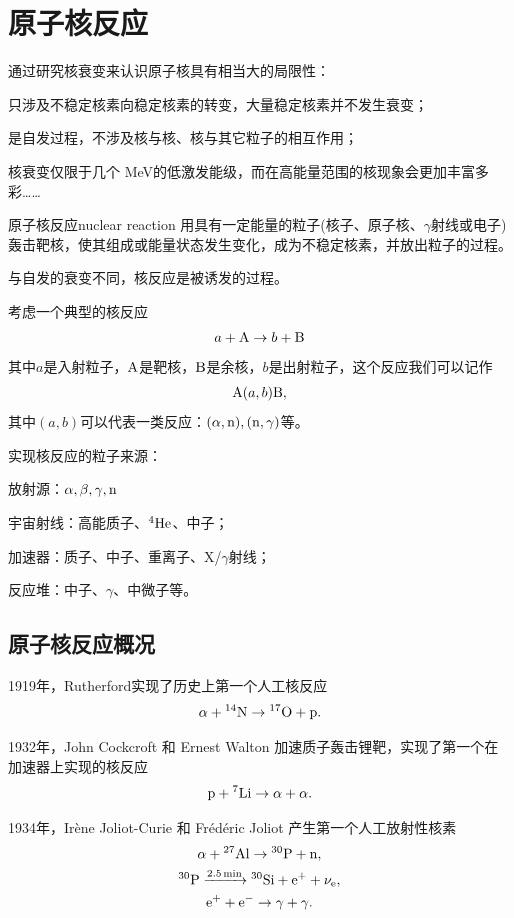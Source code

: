 \chapter{原子核反应}
通过研究核衰变来认识原子核具有相当大的局限性：
\begin{compactitem}
	\item 只涉及不稳定核素向稳定核素的转变，大量稳定核素并不发生衰变；
	\item 是自发过程，不涉及核与核、核与其它粒子的相互作用；
	\item 核衰变仅限于几个 \unit{MeV}的低激发能级，而在高能量范围的核现象会更加丰富多彩……
\end{compactitem} 

\begin{definition}{原子核反应}{nuclear reaction}
	用具有一定能量的粒子(核子、原子核、$\gamma$射线或电子)轰击靶核，使其组成或能量状态发生变化，成为不稳定核素，并放出粒子的过程。
\end{definition}
与自发的衰变不同，核反应是被诱发的过程。

考虑一个典型的核反应
\begin{align}\label{AabB}
	a + \mathrm{A} \to b + \mathrm{B}
\end{align}
其中$a$是入射粒子，$\mathrm{A}$是靶核，$\mathrm{B}$是余核，$b$是出射粒子，这个反应我们可以记作
\[
	\mathrm{A}(a,b)\mathrm{B},
\]
其中$(a,b)$可以代表一类反应：$(\alpha,\mathrm n),(\mathrm n,\gamma)$等。

实现核反应的粒子来源：
\begin{compactitem}
	\item 放射源：$\alpha,\beta,\gamma,\mathrm n$
	\item 宇宙射线：高能质子、$\nuclide4{He}$、中子；
	\item 加速器：质子、中子、重离子、X/$\gamma$射线；
	\item 反应堆：中子、$\gamma$、中微子等。
\end{compactitem}
\section{原子核反应概况}
1919年，Rutherford实现了历史上第一个人工核反应
\[
	\alpha + \nuclide{14}N \to \nuclide{17}O + \proton.
\]

1932年，John Cockcroft 和 Ernest Walton 加速质子轰击锂靶，实现了第一个在加速器上实现的核反应
\[
	\proton + \nuclide 7{Li} \to \alpha + \alpha.
\]

1934年，Irène Joliot-Curie 和 Frédéric Joliot 产生第一个人工放射性核素
\begin{gather*}
	\alpha + \nuclide{27}{Al} \to \nuclide{30}P + \neutron,\\
	\nuclide{30}P\decayto{\qty{2.5}{min}}\nuclide{30}{Si} + \electron^+ + \nu_\electron,\\
	\electron^+ + \electron^- \to \gamma + \gamma.
\end{gather*}

